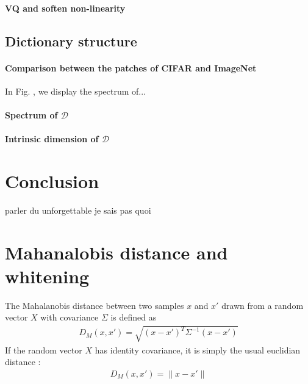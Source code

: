 \documentclass{article}
\begin{document}
{\paragraph{VQ and soften non-linearity}
\subsection{Dictionary structure}
\paragraph{Comparison between the patches of CIFAR and ImageNet} In Fig. \label{spectrum}, we display the spectrum of...
\paragraph{Spectrum of $\mathcal{D}$}
\paragraph{Intrinsic dimension of $\mathcal{D}$}
\section{Conclusion}
parler du unforgettable je sais pas quoi




{}

\newpage

\appendix

\section{Mahanalobis distance and whitening}

The Mahalanobis distance \citep{chandra1936generalised, mclachlan1999mahalanobis} between two samples $x$ and $x'$ drawn from a random vector $X$ with covariance $\Sigma$ is defined as  
\begin{align*} D_M (x, x' ) =  \sqrt{ (x - x')^T \Sigma^{-1} (x - x')} \end{align*}
If the random vector $X$ has identity covariance, it is simply the usual euclidian distance :
\begin{align*} D_M (x, x' ) =  \| x - x' \| \end{align*}

}
\end{document}
